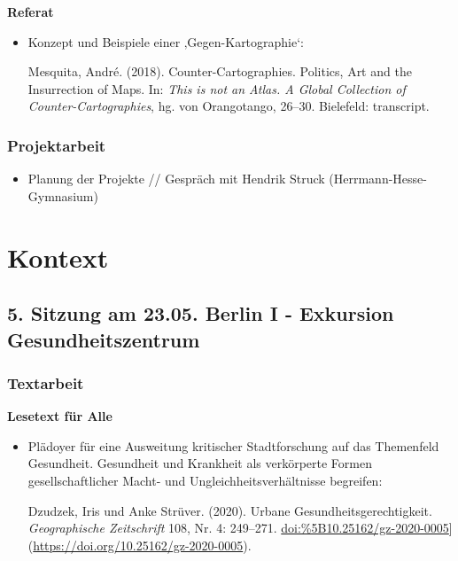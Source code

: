 \documentclass[
  ngerman,
]{article}
\providecommand{\tightlist}{%
  \setlength{\itemsep}{0pt}\setlength{\parskip}{0pt}}
\begin{document}
\textbf{Referat}

\begin{itemize}
\item
  Konzept und Beispiele einer ‚Gegen-Kartographie`:

  Mesquita, André. (2018). Counter-Cartographies. Politics, Art and the Insurrection of Maps. In: \emph{This is not an Atlas. A Global Collection of Counter-Cartographies}, hg. von Orangotango, 26--30. Bielefeld: transcript.
\end{itemize}

\hypertarget{projektarbeit-2}{%
\subsubsection*{Projektarbeit}\label{projektarbeit-2}}

\begin{itemize}
\tightlist
\item
  Planung der Projekte // Gespräch mit Hendrik Struck (Herrmann-Hesse-Gymnasium)
\end{itemize}

\hypertarget{kontext}{%
\section*{Kontext}\label{kontext}}

\hypertarget{sitzung-am-23.05.-berlin-i---exkursion-gesundheitszentrum}{%
\subsection*{5. Sitzung am 23.05. \textbar{} Berlin I - Exkursion Gesundheitszentrum}\label{sitzung-am-23.05.-berlin-i---exkursion-gesundheitszentrum}}

\hypertarget{textarbeit-4}{%
\subsubsection*{Textarbeit}\label{textarbeit-4}}

\textbf{Lesetext für Alle}

\begin{itemize}
\item
  Plädoyer für eine Ausweitung kritischer Stadtforschung auf das Themenfeld Gesundheit. Gesundheit und Krankheit als verkörperte Formen gesellschaftlicher Macht- und Ungleichheitsverhältnisse begreifen:

  Dzudzek, Iris und Anke Strüver. (2020). Urbane Gesundheitsgerechtigkeit. \emph{Geographische Zeitschrift} 108, Nr. 4: 249--271. \url{doi:\%5B10.25162/gz-2020-0005}{]}(\url{https://doi.org/10.25162/gz-2020-0005}).
\end{itemize}
\end{document}
